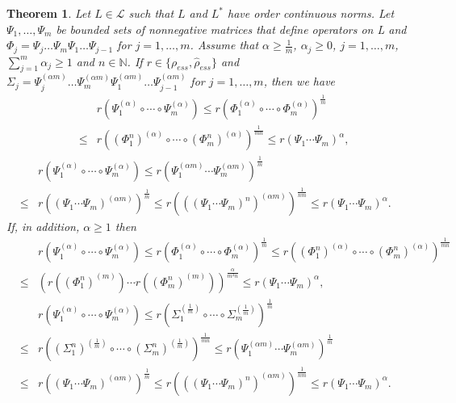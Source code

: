 \documentclass[12pt, reqno]{amsart}
\newtheorem{theorem}{Theorem}[section]
\theoremstyle{definition}
\theoremstyle{remark}
\numberwithin{equation}{section}
\newcommand{\NN}{\mathbb{N}}
\begin{document}
\begin{theorem} 
\label{kathyth2_ess}
Let $L\in \mathcal{L}$ such that %
$L$ and $L^*$ have order continuous norms. 
Let $\Psi _1, \ldots , \Psi _m$ be bounded sets of nonnegative matrices that define operators on L and
 $ \Phi _j=\Psi_j\ldots\Psi_m \Psi_1\ldots\Psi_{j-1}$ for $j=1,\ldots , m$. Assume that
 $\alpha\ge\frac{1}{m}$, $\alpha _j \ge 0$, $j=1, \ldots , m$, $\sum_{j=1}^{m}\alpha_j \ge 1$ and $n \in \NN$. If $r\in \{ \rho _{ess}, \hat{\rho} _{ess}\}$  and $ \Sigma _j=\Psi_j ^{(\alpha m)}\ldots\Psi_m ^{(\alpha m)} \Psi_1 ^{(\alpha m)} \ldots\Psi_{j-1} ^{(\alpha m)}$ for $j=1,\ldots , m$, then we have
\begin{eqnarray}
\nonumber
& & r\left(\Psi _1^{(\alpha)}\circ\cdots\circ\Psi _m^{(\alpha)}\right)\le r\left(\Phi _1^{(\alpha)}\circ\cdots\circ\Phi _m^{(\alpha)}\right)^{\frac{1}{m}} \\
&\le& r\left((\Phi _1 ^n)^{(\alpha)}\circ\cdots\circ(\Phi _m ^n)^{(\alpha)}\right)^{\frac{1}{mn}} \le r\left(\Psi_1\cdots\Psi_m\right)^{\alpha},
\label{ineqx} 
\end{eqnarray}
\begin{eqnarray}
\nonumber
& & r\left(\Psi _1^{(\alpha)}\circ\cdots\circ\Psi _m^{(\alpha)}\right)\le r\left(\Psi_1^{(\alpha m)}\cdots\Psi_m^{(\alpha m)}\right)^{\frac{1}{m}}\\
&\le&  r\left((\Psi_1\cdots\Psi_m)^{(\alpha m)}\right)^{\frac{1}{m}}\le  r\left(((\Psi_1\cdots\Psi_m)^n)^{(\alpha m)}\right)^{\frac{1}{nm}} \le
r\left(\Psi_1\cdots\Psi_m\right)^{\alpha}. \;\;\;\;\;\;
\label{ineqx2}
\end{eqnarray}
If, in addition, $\alpha \ge 1$ then %
\begin{eqnarray}
\nonumber
& & r\left(\Psi_1^{(\alpha)}\circ\cdots\circ\Psi_m^{(\alpha)}\right)  \le  r\left(\Phi_1^{(\alpha)}\circ\cdots\circ
\Phi_m^{(\alpha)}\right)^{\frac{1}{m}} \le  r\left((\Phi _1 ^n)^{(\alpha)}\circ\cdots\circ(\Phi _m ^n)^{(\alpha)}\right)^{\frac{1}{mn}} \\
&\le &\left( r\left((\Phi_1 ^n)^{(m)}\right)\cdots r\left((\Phi_m ^n)^{(m)}\right)\right)^{\frac{\alpha}{m^2 n}}
 \le r\left(\Psi_1\cdots\Psi_m\right)^{\alpha},
\label{xyz}
\end{eqnarray}
\begin{eqnarray}
\nonumber
& & r\left(\Psi _1^{(\alpha)}\circ\cdots\circ\Psi _m^{(\alpha)}\right)\le  r\left(\Sigma _1^{(\frac{1}{m})}\circ\cdots\circ\Sigma _m^{(\frac{1}{m})}\right)^{\frac{1}{m}} \\
\nonumber
&\le &  r\left((\Sigma _1 ^n)^{(\frac{1}{m})}\circ\cdots\circ(\Sigma _m ^n)^{(\frac{1}{m})}\right)^{\frac{1}{mn}}
 \le r\left(\Psi_1^{(\alpha m)}\cdots\Psi_m^{(\alpha m)}\right)^{\frac{1}{m}} \\
&\le &  r\left((\Psi_1\cdots\Psi_m)^{(\alpha m)}\right)^{\frac{1}{m}}\le  r\left(((\Psi_1\cdots\Psi_m)^n)^{(\alpha m)}\right)^{\frac{1}{nm}} \le r\left(\Psi_1\cdots\Psi_m\right)^{\alpha}. \;\;\;\;\;\;
\label{kraj}
\end{eqnarray}
\end{theorem}
\end{document}
